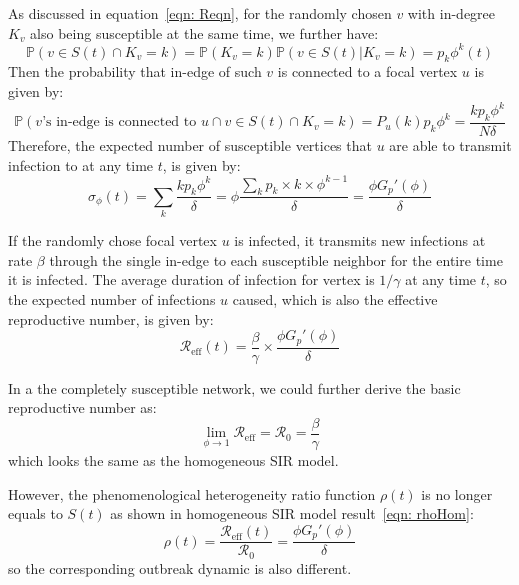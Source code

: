 \documentclass[12pt]{article}
\theoremstyle{plain}
\theoremstyle{definition}
\begin{document}
As discussed in equation~\eqref{eqn: Reqn}, for the randomly chosen $v$ with in-degree $K_v$ also being susceptible at the same time, we further have:
\begin{equation}
	\mathbb{P}(v\in S(t) \cap K_v=k)=\mathbb{P}(K_v=k) \mathbb{P}(v\in S(t)| K_v=k )=p_k \phi^k (t)
\end{equation}
Then the probability that in-edge of such $v$ is connected to a focal vertex $u$ is given by:
\begin{equation}
	\mathbb{P}(v \text{'s in-edge is connected to } u \cap v\in S(t) \cap K_v =k)=P_u(k) p_k \phi^k=\frac{k p_k \phi^k}{N\delta}
\end{equation}
Therefore, the expected number of susceptible vertices that $u$ are able to transmit infection to at any time $t$, is given by:
\begin{equation}
	\sigma_{\phi}(t)=\sum_{k}\frac{k p_k \phi^k}{\delta}=\phi \frac{\sum_{k} p_k \times k \times\phi^{k-1}}{\delta}=\frac{\phi G_p'(\phi)}{\delta}
\end{equation}

If the randomly chose focal vertex $u$ is infected, it transmits new infections at rate $\beta$ through the single in-edge to each susceptible neighbor for the entire time it is infected.
The average duration of infection for vertex is $1/\gamma$ at any time $t$, so the expected number of infections $u$ caused, which is also the effective reproductive number, is given by:
\begin{equation}
	\mathcal{R}_\text{eff}(t)=\frac{\beta}{\gamma}\times \frac{\phi G_p'(\phi)}{\delta}
\end{equation}

In a the completely susceptible network, we could further derive the basic reproductive number as:
\begin{equation}
	\lim_{\phi \rightarrow 1} \mathcal{R}_\text{eff}=\mathcal{R}_0 =\frac{\beta}{\gamma}
\end{equation}
which looks the same as the homogeneous SIR model.

However, the phenomenological heterogeneity ratio function $\rho(t)$ is no longer equals to $S(t)$ as shown in homogeneous SIR model result~\eqref{eqn: rhoHom}:
\begin{equation}
	\label{eqn: rhoHet}
	\rho(t)=\frac{\mathcal{R}_{\text{eff}}(t)}{\mathcal{R}_{0}}=\frac{\phi G_p'(\phi)}{\delta}
\end{equation}
so the corresponding outbreak dynamic is also different.
\end{document}
